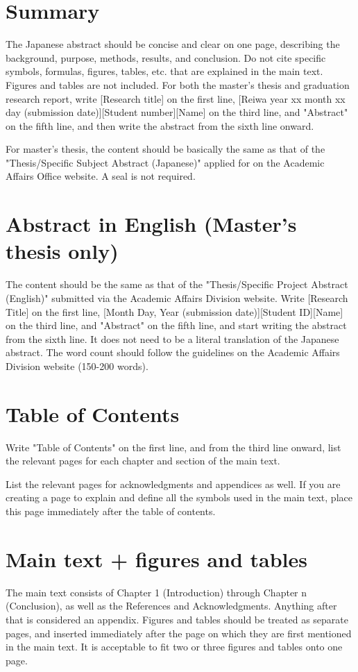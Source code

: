 \section{Summary}
The Japanese abstract should be concise and clear on one page, describing the background, purpose, methods, results, and conclusion. Do not cite specific symbols, formulas, figures, tables, etc. that are explained in the main text. Figures and tables are not included. For both the master's thesis and graduation research report, write [Research title] on the first line, [Reiwa year xx month xx day (submission date)][Student number][Name] on the third line, and "Abstract" on the fifth line, and then write the abstract from the sixth line onward.

For master's thesis, the content should be basically the same as that of the "Thesis/Specific Subject Abstract (Japanese)" applied for on the Academic Affairs Office website. A seal is not required.

\section{Abstract in English (Master's thesis only)}
The content should be the same as that of the "Thesis/Specific Project Abstract (English)" submitted via the Academic Affairs Division website. Write [Research Title] on the first line, [Month Day, Year (submission date)][Student ID][Name] on the third line, and "Abstract" on the fifth line, and start writing the abstract from the sixth line. It does not need to be a literal translation of the Japanese abstract. The word count should follow the guidelines on the Academic Affairs Division website (150-200 words).

\section{Table of Contents}
Write "Table of Contents" on the first line, and from the third line onward, list the relevant pages for each chapter and section of the main text.

List the relevant pages for acknowledgments and appendices as well. If you are creating a page to explain and define all the symbols used in the main text, place this page immediately after the table of contents.

\section{Main text + figures and tables}
The main text consists of Chapter 1 (Introduction) through Chapter n (Conclusion), as well as the References and Acknowledgments. Anything after that is considered an appendix. Figures and tables should be treated as separate pages, and inserted immediately after the page on which they are first mentioned in the main text. It is acceptable to fit two or three figures and tables onto one page.

